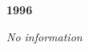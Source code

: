 \begin{center}
  \Huge
  \textbf{1996}
\end{center}

\begin{center}
  \textit{No information}
\end{center}

\vspace{50mm}

\pagebreak
